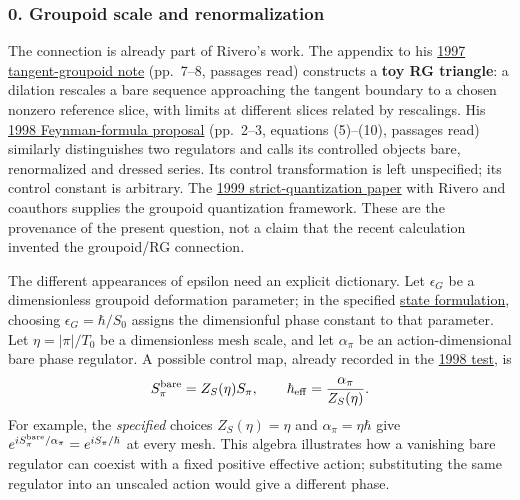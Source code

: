 \documentclass[11pt,a4paper]{article}
\begin{document}
\hypertarget{groupoid-scale-and-renormalization}{%
\subsubsection{0. Groupoid scale and
renormalization}\label{groupoid-scale-and-renormalization}}

The connection is already part of Rivero's work. The appendix to his
\href{https://arxiv.org/pdf/dg-ga/9710026}{1997 tangent-groupoid note}
(pp.~7--8, passages read) constructs a \textbf{toy RG triangle}: a
dilation rescales a bare sequence approaching the tangent boundary to a
chosen nonzero reference slice, with limits at different slices related
by rescalings. His \href{https://arxiv.org/pdf/quant-ph/9803035}{1998
Feynman-formula proposal} (pp.~2--3, equations (5)--(10), passages read)
similarly distinguishes two regulators and calls its controlled objects
bare, renormalized and dressed series. Its control transformation is
left unspecified; its control constant is arbitrary. The
\href{../docs/CarinenaEtAl_TangentGroupoid_1999.md}{1999
strict-quantization paper} with Rivero and coauthors supplies the
groupoid quantization framework. These are the provenance of the present
question, not a claim that the recent calculation invented the
groupoid/RG connection.

The different appearances of epsilon need an explicit dictionary. Let
\(\epsilon_G\) be a dimensionless groupoid deformation parameter; in the
specified \href{groupoid-quantum-newton-states.md}{state formulation},
choosing \(\epsilon_G=\hbar/S_0\) assigns the dimensionful phase
constant to that parameter. Let \(\eta=|\pi|/T_0\) be a dimensionless
mesh scale, and let \(\alpha_\pi\) be an action-dimensional bare phase
regulator. A possible control map, already recorded in the
\href{rivero-1998-conjecture-central-forces.md}{1998 test}, is \[
 S_\pi^{\rm bare}=Z_S(\eta)S_\pi,\qquad
 \hbar_{\rm eff}=\frac{\alpha_\pi}{Z_S(\eta)}.
\] For example, the \emph{specified} choices \(Z_S(\eta)=\eta\) and
\(\alpha_\pi=\eta\hbar\) give
\(e^{iS_\pi^{\rm bare}/\alpha_\pi}=e^{iS_\pi/\hbar}\) at every mesh.
This algebra illustrates how a vanishing bare regulator can coexist with
a fixed positive effective action; substituting the same regulator into
an unscaled action would give a different phase.
\end{document}
